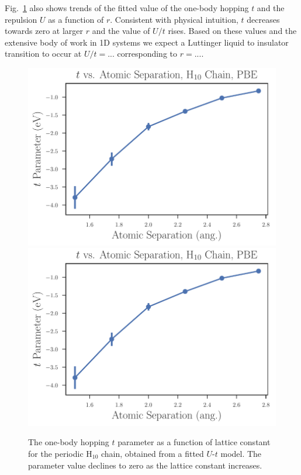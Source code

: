 Fig.~\ref{fig:Parameters-vs-Bond-t} also shows trends of the fitted value of the one-body hopping $t$ 
and the repulsion $U$ as a function of $r$. Consistent with physical intuition, $t$ decreases towards zero at larger $r$
and the value of $U/t$ rises. Based on these values and the extensive body of work in 1D systems we expect a Luttinger liquid 
to insulator transition to occur at $U/t=...$ corresponding to $r=...$.  

\begin{figure}
\centering
\includegraphics[scale=0.5]{./Figures/$t$_vs_separation_h_chain_ols.pdf}
\includegraphics[scale=0.5]{./Figures/$t$_vs_separation_h_chain_ols.pdf}
\caption{ The one-body hopping $t$ parameter as a function of lattice constant for the periodic H$_{10}$ chain, obtained from a fitted $U$-$t$ model. The parameter value declines to zero as the lattice constant increases. }\label{fig:Parameters-vs-Bond-t}

\end{figure}
